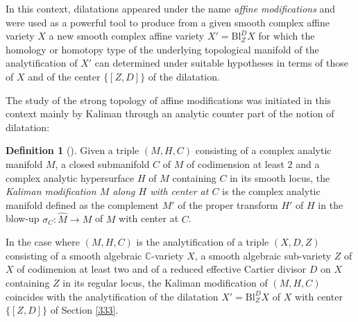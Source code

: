 \documentclass[10pt]{alggeom}
\theoremstyle{definition}
\newtheorem{dfn}[thm]{Definition}
\numberwithin{equation}{section}
\begin{document}
In this context, dilatations appeared under the name \emph{affine
modifications} and were used as a powerful tool to produce from a
given smooth complex affine variety $X$ a new smooth complex affine
variety $X'=\mathrm{Bl}_{Z}^{D}X$ for which the homology or homotopy
type of the underlying topological manifold of the analytification
of $X'$ can determined under suitable hypotheses in terms of those
of $X$ and of the center $\{[Z,D]\}$ of the dilatation. 

\vspace{0.1cm}

The study of the strong topology of affine modifications was initiated
in this context mainly by Kaliman through an analytic counter part
of the notion of dilatation: 

\begin{dfn}[\cite{Ka94}]
Given a triple $(M,H,C)$ consisting of a complex analytic manifold
$M$, a closed submanifold $C$ of $M$ of codimension at least $2$
and a complex analytic hypersurface $H$ of $M$ containing $C$ in
its smooth locus, the \emph{Kaliman modification $M$ along $H$ with
center at $C$} is the complex analytic manifold defined as the complement
$M'$ of the proper transform $H'$ of $H$ in the blow-up $\sigma_{C}:\hat{M}\to M$
of $M$ with center at $C$. 
\end{dfn}

In the case where $(M,H,C)$ is the analytification of a triple $(X,D,Z)$
consisting of a smooth algebraic $\mathbb{C}$-variety $X$, a smooth
algebraic sub-variety $Z$ of $X$ of codimenion at least two and
of a reduced effective Cartier divisor $D$ on $X$ containing $Z$
in its regular locus, the Kaliman modification of $(M,H,C)$ coincides
with the analytification of the dilatation $X'=\mathrm{Bl}_{Z}^{D}X$
of $X$ with center $\{[Z,D]\}$ of Section \ref{333}. 

\vspace{0.1cm}
\end{document}
